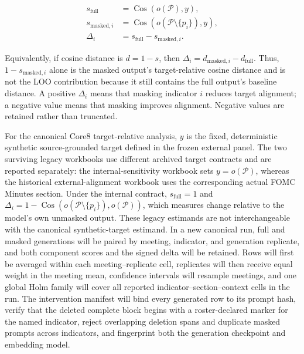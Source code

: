 \begin{align}
 s_{\mathrm{full}} &= \operatorname{Cos}\!\left(o(\mathcal{P}),y\right), \nonumber\\
 s_{\mathrm{masked},i} &= \operatorname{Cos}\!\left(o(\mathcal{P}\setminus\{p_i\}),y\right), \nonumber\\
 \Delta_i &= s_{\mathrm{full}}-s_{\mathrm{masked},i}.
 \label{eq:ch2:loo_delta}
\end{align}

Equivalently, if cosine distance is $d=1-s$, then
$\Delta_i=d_{\mathrm{masked},i}-d_{\mathrm{full}}$. Thus,
$1-s_{\mathrm{masked},i}$ alone is the masked output's target-relative cosine
distance and is not the LOO contribution because it still contains the full
output's baseline distance. A positive $\Delta_i$ means that masking indicator $i$ reduces
target alignment; a negative value means that masking improves alignment.
Negative values are retained rather than truncated.

For the canonical Core8 target-relative analysis, $y$ is the fixed,
deterministic synthetic source-grounded target defined in the frozen external
panel. The two surviving legacy workbooks use different archived target
contracts and are reported separately: the internal-sensitivity workbook sets
$y=o(\mathcal{P})$, whereas the historical external-alignment workbook uses
the corresponding actual FOMC Minutes section. Under the internal contract,
$s_{\mathrm{full}}=1$ and
$\Delta_i=1-\operatorname{Cos}(o(\mathcal{P}\setminus\{p_i\}),o(\mathcal{P}))$,
which measures change relative to the model's own unmasked output. These
legacy estimands are not interchangeable with the canonical synthetic-target
estimand. In a new canonical run, full and masked generations will be paired
by meeting, indicator, and generation replicate, and both component scores
and the signed delta will be retained. Rows will first be averaged within each
meeting--replicate cell,
replicates will then receive equal weight in the meeting mean, confidence
intervals will resample meetings, and one global Holm family will cover all
reported indicator--section--context cells in the run. The intervention
manifest will bind every generated row to its prompt hash, verify that the
deleted complete block begins with a roster-declared marker for the named
indicator, reject overlapping deletion spans and duplicate masked prompts
across indicators, and fingerprint both the generation checkpoint and
embedding model.



